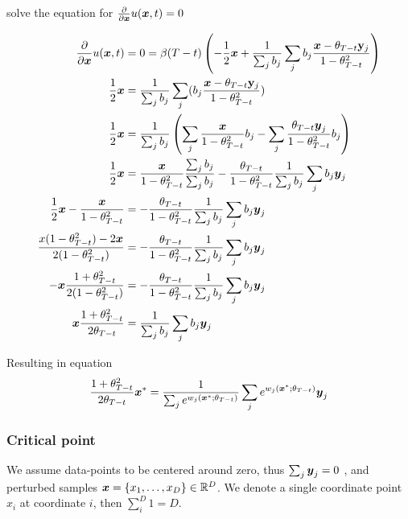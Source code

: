 solve the equation for $ \frac{\partial}{\partial\boldsymbol{x}}u(\boldsymbol{x}, t)   = 0$

\begin{align}
  \frac{\partial}{\partial\boldsymbol{x}}u(\boldsymbol{x}, t)   &= 0 = \beta(T - t) \left( -\frac{1}{2}  \boldsymbol{x} +  \frac{1}{\sum_j b_j}\sum_j b_j \frac{\boldsymbol{x} -  \theta_{T - t}\mathbf{y}_j}{ 1 - \theta_{T-t}^2} \right)  \nonumber\\
  \frac{1}{2}\boldsymbol{x} &= \frac{1}{\sum_j b_j}\sum_j (b_j \frac{\boldsymbol{x} - \theta_{T-t}\mathbf{y}_j}{ 1 - \theta_{T-t}^2}) \nonumber\\
   \frac{1}{2}\boldsymbol{x} &= \frac{1}{\sum_j b_j}\left(\sum_j  \frac{\boldsymbol{x}}{ 1 - \theta_{T-t}^2}b_j - \sum_j\frac{\theta_{T-t}\boldsymbol{y}_j}{ 1 - \theta_{T-t}^2}b_j\right) \nonumber\\
   \frac{1}{2}\boldsymbol{x} &= \frac{\boldsymbol{x}}{ 1 - \theta_{T-t}^2}\frac{\sum_j b_j }{\sum_j b_j} - \frac{\theta_{T-t}}{ 1 - \theta_{T-t}^2}\frac{1}{\sum_j b_j}\sum_j b_j \boldsymbol{y}_j  \nonumber\\
    \frac{1}{2}\boldsymbol{x} - \frac{\boldsymbol{x}}{ 1 - \theta_{T-t}^2} &= - \frac{\theta_{T-t}}{ 1 - \theta_{T-t}^2}\frac{1}{\sum_j b_j}\sum_j b_j \boldsymbol{y}_j \nonumber\\
     \frac{x(1 - \theta_{T-t}^2)-2\boldsymbol{x}}{ 2(1 - \theta_{T-t}^2)} &= - \frac{\theta_{T-t}}{ 1 - \theta_{T-t}^2}\frac{1}{\sum_j b_j}\sum_j b_j \boldsymbol{y}_j \nonumber\\
     -\boldsymbol{x}\frac{1 + \theta_{T-t}^2}{ 2(1 - \theta_{T-t}^2)} &= - \frac{\theta_{T-t}}{ 1 - \theta_{T-t}^2}\frac{1}{\sum_j b_j}\sum_j b_j \boldsymbol{y}_j  \nonumber\\
     \boldsymbol{x}\frac{1 + \theta_{T-t}^2}{ 2 \theta_{T-t}} &=   \frac{1}{\sum_j b_j}\sum_j b_j \boldsymbol{y}_j
\end{align}

Resulting in equation
\begin{equation}
    \frac{1+\theta_{T-t}^2}{2\theta_{T-t}} \boldsymbol{x} ^*= \frac{1}{\sum_j e^{w_j(\boldsymbol{x}^*; \theta_{T - t}) }}\sum_j e^{w_j(\boldsymbol{x}^*; \theta_{T - t}) } \boldsymbol{y}_j
\end{equation}


\newpage
\subsubsection{Critical point}

We assume data-points to be centered around zero, thus $\sum_j \boldsymbol{y}_j = 0~$, and perturbed samples $\boldsymbol{x}= \{x_1, \dots, x_D\} \in \mathbb{R}^D$. We denote a single coordinate point $x_i$ at coordinate $i$, then $\sum_i^D 1=D$.


